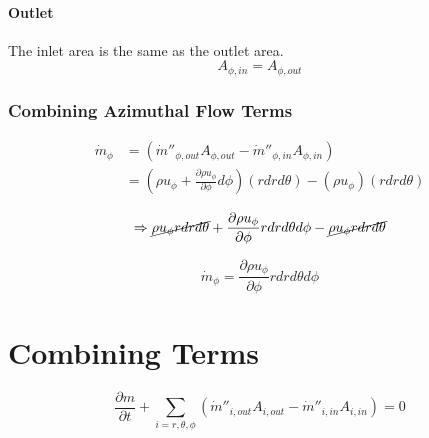 \documentclass[12pt, letterpaper, twoside]{article}
\begin{document}
        \paragraph{Outlet}
            The inlet area is the same as the outlet area.
            \begin{equation}
                A_{\phi,in} = A_{\phi,out}
            \end{equation}

        \subsubsection{Combining Azimuthal Flow Terms}
            \begin{equation*}
            \begin{split}
                \dot{m}_{\phi} & = (\dot{m}''_{\phi,out} A_{\phi,out} - \dot{m}''_{\phi,in} A_{\phi,in}) \\
                & = \left( \rho u_{\phi}  + \frac{\partial \rho u_{\phi}}{\partial \phi} d\phi \right)
                \left(r dr d\theta \right) -
                \left(\rho u_{\phi} \right) \left(r dr d\theta \right)
            \end{split}
            \end{equation*}

            \begin{equation*}
                \Rightarrow
                \cancel{\rho u_\phi r dr d\theta} + \frac{\partial \rho u_{\phi}}{\partial \phi} r dr d\theta d\phi -
                \cancel{\rho u_\phi r dr d\theta} 
            \end{equation*}

            \begin{equation}
                \dot{m}_{\phi} = \frac{\partial \rho u_{\phi}}{\partial \phi} r dr d\theta d\phi 
            \end{equation}


\section{Combining Terms}\label{sect:combineterms}

    \begin{equation}
        \frac{\partial m}{\partial t} + 
        \sum_{i=r, \theta, \phi}
        (\dot{m}''_{i,out} A_{i,out} - \dot{m}''_{i,in} A_{i,in}) = 0 
        \label{eq:base_equation_full}
    \end{equation}
\end{document}
